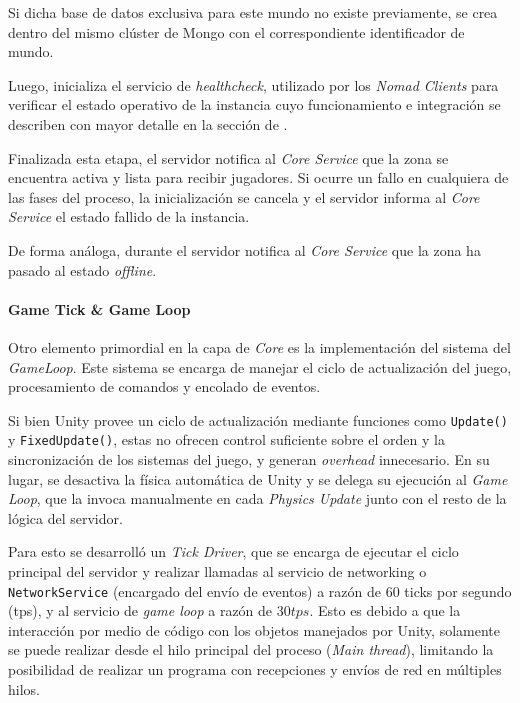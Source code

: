 Si dicha base de datos exclusiva para este mundo no existe previamente, se crea dentro del mismo clúster de Mongo
con el correspondiente identificador de mundo.

Luego, inicializa el servicio de \textit{healthcheck}, utilizado por los \textit{Nomad Clients} para verificar el 
estado operativo de la instancia cuyo funcionamiento e integración se describen con mayor detalle en la sección de .

\vspace{0.25cm}

Finalizada esta etapa, el servidor notifica al \textit{Core Service} que la zona se encuentra activa y lista para recibir jugadores.
Si ocurre un fallo en cualquiera de las fases del proceso, la inicialización se cancela y el servidor informa al \textit{Core Service}
el estado fallido de la instancia.

De forma análoga, durante el servidor notifica al \textit{Core Service} que la zona ha 
pasado al estado \textit{offline}.

\paragraph{Game Tick \& Game Loop}

Otro elemento primordial en la capa de \textit{Core} es la implementación del sistema del \textit{GameLoop}.
Este sistema se encarga de manejar el ciclo de actualización del juego, procesamiento de
comandos y encolado de eventos.

\vspace{0.25cm}

Si bien Unity provee un ciclo de actualización mediante funciones como \texttt{Update()} y \texttt{FixedUpdate()}, estas no ofrecen control
suficiente sobre el orden y la sincronización de los sistemas del juego, y generan \textit{overhead} innecesario.
En su lugar, se desactiva la física automática de Unity y se delega
su ejecución al \textit{Game Loop}, que la invoca manualmente en cada \textit{Physics Update} junto con el resto de la lógica del servidor.

Para esto se desarrolló un \textit{Tick Driver}, que se encarga de ejecutar el ciclo principal del servidor y realizar llamadas
al servicio de networking o \texttt{NetworkService} (encargado del envío de eventos) a razón de $60$ ticks por segundo (tps), y al servicio de \textit{game loop}
a razón de $30 tps$. Esto es debido a que la interacción por medio de código con los objetos manejados por Unity, solamente 
se puede realizar desde el hilo principal del proceso (\textit{Main thread}), limitando la posibilidad de realizar un programa
con recepciones y envíos de red en múltiples hilos.

